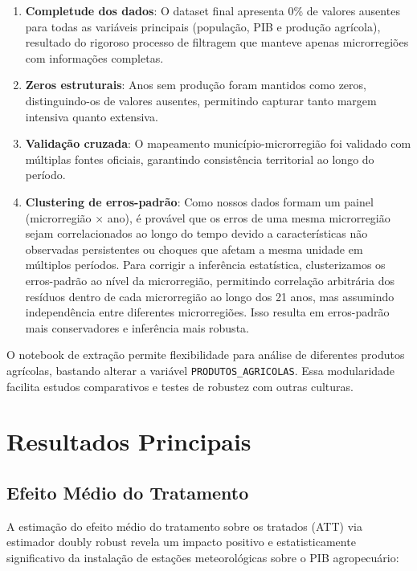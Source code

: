 \documentclass[
	12pt,				%
	oneside,			%
	a4paper,			%
	english,			%
	french,				%
	spanish,			%
	brazil				%
	]{abntex2}
\begin{document}
\begin{enumerate}
\item \textbf{Completude dos dados}: O dataset final apresenta 0\% de valores ausentes para todas as variáveis principais (população, PIB e produção agrícola), resultado do rigoroso processo de filtragem que manteve apenas microrregiões com informações completas.

\item \textbf{Zeros estruturais}: Anos sem produção foram mantidos como zeros, distinguindo-os de valores ausentes, permitindo capturar tanto margem intensiva quanto extensiva.

\item \textbf{Validação cruzada}: O mapeamento município-microrregião foi validado com múltiplas fontes oficiais, garantindo consistência territorial ao longo do período.

\item \textbf{Clustering de erros-padrão}: Como nossos dados formam um painel (microrregião × ano), é provável que os erros de uma mesma microrregião sejam correlacionados ao longo do tempo devido a características não observadas persistentes ou choques que afetam a mesma unidade em múltiplos períodos. Para corrigir a inferência estatística, clusterizamos os erros-padrão ao nível da microrregião, permitindo correlação arbitrária dos resíduos dentro de cada microrregião ao longo dos 21 anos, mas assumindo independência entre diferentes microrregiões. Isso resulta em erros-padrão mais conservadores e inferência mais robusta.
\end{enumerate}

O notebook de extração permite flexibilidade para análise de diferentes produtos agrícolas, bastando alterar a variável \texttt{PRODUTOS\_AGRICOLAS}. Essa modularidade facilita estudos comparativos e testes de robustez com outras culturas.

\section{Resultados Principais}

\subsection{Efeito Médio do Tratamento}

A estimação do efeito médio do tratamento sobre os tratados (ATT) via estimador doubly robust revela um impacto positivo e estatisticamente significativo da instalação de estações meteorológicas sobre o PIB agropecuário:
\end{document}
